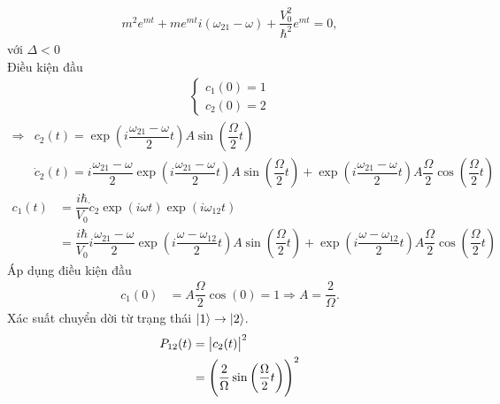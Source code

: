\documentclass{article}
\newcommand{\f}[2]{\dfrac{#1}{#2}}
\begin{document}
\begin{enumerate}
	      \begin{align*}
		      m^{2} e^{mt} + m e^{mt} i(\omega_{21} - \omega) +  \f{V_{0}^2}{\hbar^2} e^{mt} = 0 ,
	      \end{align*}
	      với $\Delta <0 $\\
	      Điều kiện đầu
	      \begin{align*}
		      \begin{cases}
			      c_{1}(0) = 1 \\
			      c_{2}(0) = 2
		      \end{cases}
	      \end{align*}
	      \begin{align*}
		      \Rightarrow
		       & c_{2}(t) = \exp(i \f{\omega_{21} - \omega }{2} t) A \sin\left(\f{\Omega}{2}t\right)                                                                                                                                            \\
		       & \dot{c}_{2}(t) = i \f{\omega_{21} - \omega}{2}\exp\left(i \f{\omega_{21} - \omega}{2}t\right)A \sin\left(\f{\Omega}{2}t\right) + \exp\left(i \f{\omega_{21} - \omega}{2}t\right)A\f{\Omega}{2} \cos\left(\f{\Omega}{2}t\right)
	      \end{align*}
	      \begin{align*}
		      c_{1} (t)
		       & = \f{i\hbar}{V_{0}}\dot{c}_{2} \exp(i\omega t)\exp(i \omega_{12} t)                                                                                                                                                                \\
		       & = \f{i\hbar}{V_{0}}i \f{\omega_{21} - \omega}{2} \exp\left(i \f{\omega - \omega_{12}}{2}t\right) A\sin\left(\f{\Omega}{2}t\right) + \exp\left(i \f{\omega - \omega_{12}}{2}t\right) A\f{\Omega}{2}\cos\left(\f{\Omega}{2} t\right)
	      \end{align*}
	      Áp dụng điều kiện đầu
	      \begin{align*}
		      c_{1}(0)
		       & = A\f{\Omega}{2}\cos(0) = 1 \Rightarrow A = \f{2}{\Omega}.
	      \end{align*}
	      Xác suất chuyển dời từ trạng thái $\ket{1} \rightarrow \ket{2}$.
	      \begin{align*}
		      P_{12}(t)
		       & = \abs{c_{2}(t)}^2                                              \\
		       & = \left(\f{2}{\Omega} \sin\left(\f{\Omega}{2}t\right) \right)^2
	      \end{align*}

\end{enumerate}
\end{document}

